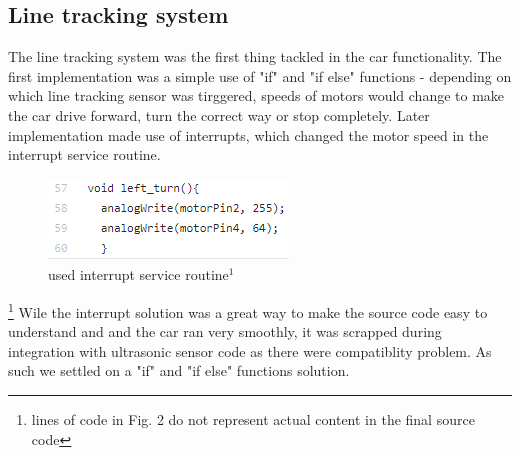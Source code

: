 \documentclass[conference]{IEEEtran}
\begin{document}
\subsection{Line tracking system}
The line tracking system was the first thing tackled in the car functionality. The first implementation was a simple use of "if" and "if else" functions - depending on which line tracking sensor was tirggered, speeds of motors would change to make the car drive forward, turn the correct way or stop completely. Later implementation made use of interrupts, which changed the motor speed in the interrupt service routine.
\begin{figure}[h!]
	\includegraphics[width=\linewidth]{examplecode1.png}
	\caption{used interrupt service routine$^{1}$}
	\label{fig:EXC1}
\end{figure}
\footnote{lines of code in Fig. 2 do not represent actual content in the final source code}
Wile the interrupt solution was a great way to make the source code easy to understand and and the car ran very smoothly, it was scrapped during integration with ultrasonic sensor code as there were compatiblity problem. As such we settled on a "if" and "if else" functions solution.
\end{document}
